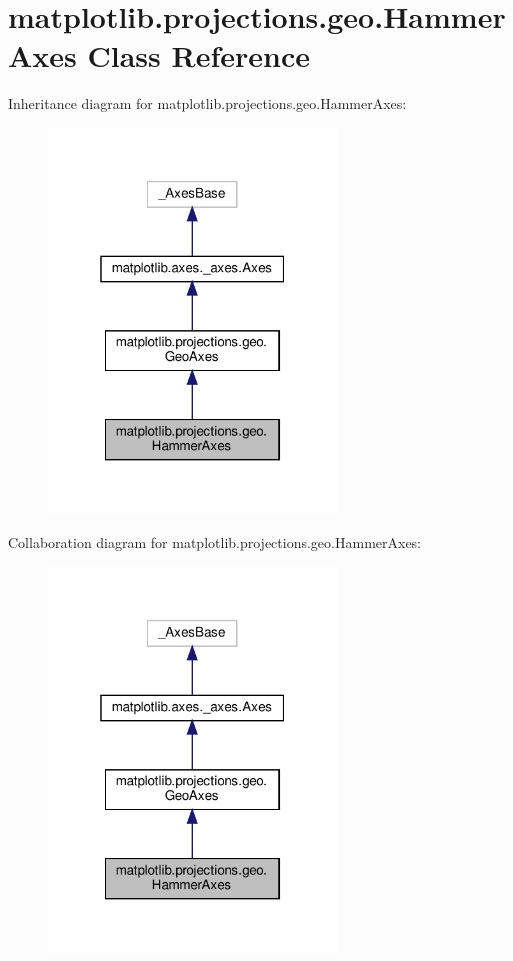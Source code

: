 \hypertarget{classmatplotlib_1_1projections_1_1geo_1_1HammerAxes}{}\section{matplotlib.\+projections.\+geo.\+Hammer\+Axes Class Reference}
\label{classmatplotlib_1_1projections_1_1geo_1_1HammerAxes}


Inheritance diagram for matplotlib.\+projections.\+geo.\+Hammer\+Axes\+:
\nopagebreak
\begin{figure}[H]
\begin{center}
\leavevmode
\includegraphics[width=217pt]{classmatplotlib_1_1projections_1_1geo_1_1HammerAxes__inherit__graph}
\end{center}
\end{figure}


Collaboration diagram for matplotlib.\+projections.\+geo.\+Hammer\+Axes\+:
\nopagebreak
\begin{figure}[H]
\begin{center}
\leavevmode
\includegraphics[width=217pt]{classmatplotlib_1_1projections_1_1geo_1_1HammerAxes__coll__graph}
\end{center}
\end{figure}
